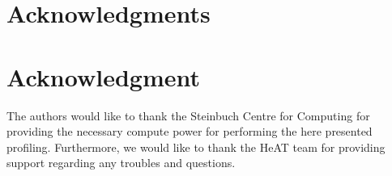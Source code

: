 
\ifCLASSOPTIONcompsoc
  \section*{Acknowledgments}
\else
  \section*{Acknowledgment}
\fi
The authors would like to thank the Steinbuch Centre for Computing for providing the necessary compute power for
performing the here presented profiling.
Furthermore, we would like to thank the \gls{HeAT} team for providing support regarding any troubles and questions.
